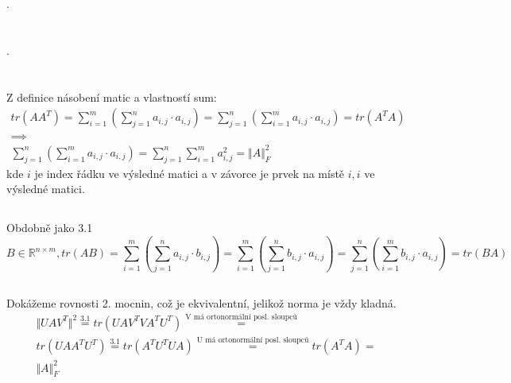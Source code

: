 \documentclass[12pt, a4paper]{article}
\begin{document}
\section{}
.

\section{}
.

\section{}
\subsection{}
Z definice násobení matic a vlastností sum:
\begin{gather*}
tr(AA^T) = \sum_{i=1}^{m}(\sum_{j=1}^{n} a_{i,j} \cdot a_{i,j}) = \sum_{j=1}^{n}(\sum_{i=1}^{m} a_{i,j} \cdot a_{i,j}) = tr(A^TA) \\
\implies \\
\sum_{j=1}^{n}(\sum_{i=1}^{m} a_{i,j} \cdot a_{i,j}) = \sum_{j=1}^{n}\sum_{i=1}^{m} a_{i,j}^2 = {\Vert A \Vert}_F^2
\end{gather*}
kde $i$ je index řádku ve výsledné matici a v závorce je prvek na místě $i,i$ ve výsledné matici.
\subsection{}
Obdobně jako 3.1
\[ B \in \mathbb{R}^{n \times m}, tr(AB)= \sum_{i=1}^{m}(\sum_{j=1}^{n} a_{i,j} \cdot b_{i,j}) = \sum_{i=1}^{m}(\sum_{j=1}^{n} b_{i,j} \cdot a_{i,j}) = \sum_{j=1}^{n}(\sum_{i=1}^{m} b_{i,j} \cdot a_{i,j}) = tr(BA)\]

\subsection{}
Dokážeme rovnosti 2. mocnin, což je ekvivalentní, jelikož norma je vždy kladná.
\begin{gather*}
\Vert UAV^T \Vert^2 \stackrel{\text{3.1}}{=} tr(UAV^{T}VA^{T}U^{T}) \stackrel{\text{V má ortonormální posl. sloupců}}{=} \\
tr(UAA^{T}U^{T}) \stackrel{\text{3.1}}{=} tr(A^{T}U^{T}UA) \stackrel{\text{U má ortonormální posl. sloupců}}{=} tr(A^TA) = \\
\Vert A \Vert_{F}^2
\end{gather*}

\section{}
\end{document}
